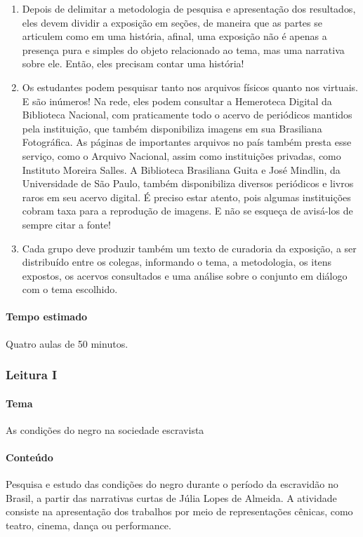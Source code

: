 \documentclass[12pt]{extarticle}
\begin{document}
\begin{enumerate}
\item
Depois de delimitar a metodologia de pesquisa e apresentação dos
resultados, eles devem dividir a exposição em seções, de maneira que as
partes se articulem como em uma história, afinal, uma exposição não é
apenas a presença pura e simples do objeto relacionado ao tema, mas uma
narrativa sobre ele. Então, eles precisam contar uma história!

\item
Os estudantes podem pesquisar tanto nos arquivos físicos quanto nos
virtuais. E são inúmeros! Na rede, eles podem consultar a Hemeroteca
Digital da Biblioteca Nacional, com praticamente todo o acervo de
periódicos mantidos pela instituição, que também disponibiliza imagens
em sua Brasiliana Fotográfica. As páginas de importantes arquivos no
país também presta esse serviço, como o Arquivo Nacional, assim como
instituições privadas, como Instituto Moreira Salles. A Biblioteca
Brasiliana Guita e José Mindlin, da Universidade de São Paulo, também
disponibiliza diversos periódicos e livros raros em seu acervo digital.
É preciso estar atento, pois algumas instituições cobram taxa para a reprodução
de imagens. E não se esqueça de avisá-los de sempre citar a fonte!

\item
Cada grupo deve produzir também um texto de curadoria da exposição, a
ser distribuído entre os colegas, informando o tema, a metodologia, os
itens expostos, os acervos consultados e uma análise sobre o conjunto em
diálogo com o tema escolhido.
\end{enumerate}

\paragraph{Tempo estimado} Quatro aulas de 50 minutos.



\subsubsection{Leitura I}


\paragraph{Tema} As condições do negro na sociedade escravista

\paragraph{Conteúdo} Pesquisa e estudo das condições do negro durante o
período da escravidão no Brasil, a partir das narrativas curtas de Júlia
Lopes de Almeida. A atividade consiste na apresentação dos trabalhos por
meio de representações cênicas, como teatro, cinema, dança ou
performance.
\end{document}
